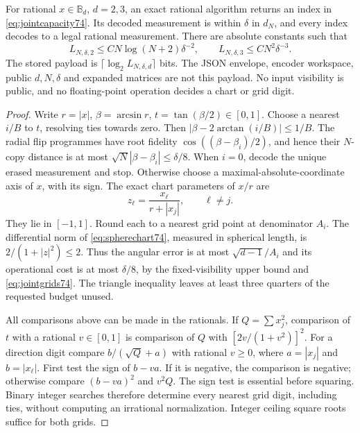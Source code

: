 \begin{theorem}\label{thm:jointcodec74}
For rational $x\in\mathbb B_d$, $d=2,3$, an exact rational algorithm
returns an index in \eqref{eq:jointcapacity74}. Its decoded measurement
is within $\delta$ in $d_N$, and every index decodes to a legal rational
measurement. There are absolute constants such that
\[
 L_{N,\delta,2}\le C N\log(N+2)\delta^{-2},\qquad
 L_{N,\delta,3}\le C N^2\delta^{-3}.
\]
The stored payload is $\lceil\log_2L_{N,\delta,d}\rceil$ bits. The
JSON envelope, encoder workspace, public $d,N,\delta$ and expanded
matrices are not this payload. No input visibility is public, and no
floating-point operation decides a chart or grid digit.
\end{theorem}
\begin{proof}
Write $r=|x|$, $\beta=\arcsin r$, $t=\tan(\beta/2)\in[0,1]$.
Choose a nearest $i/B$ to $t$, resolving ties towards zero. Then
$|\beta-2\arctan(i/B)|\le1/B$. The radial flip programmes have root
fidelity $\cos((\beta-\beta_i)/2)$, and hence their $N$-copy distance
is at most $\sqrt N|\beta-\beta_i|\le\delta/8$.
When $i=0$, decode the unique erased measurement and stop.
Otherwise choose a maximal-absolute-coordinate axis of $x$, with its
sign. The exact chart parameters of $x/r$ are
\[
 z_\ell=\frac{x_\ell}{r+|x_j|},\qquad \ell\ne j.
\]
They lie in $[-1,1]$. Round each to a nearest grid point at denominator
$A_i$. The differential norm of \eqref{eq:spherechart74}, measured
in spherical length, is $2/(1+|z|^2)\le2$. Thus the angular error is
at most $\sqrt{d-1}/A_i$ and its operational cost is at most $\delta/8$,
by the fixed-visibility upper bound and \eqref{eq:jointgrids74}.
The triangle inequality leaves at least three quarters of the
requested budget unused.

All comparisons above can be made in the rationals. If $Q=\sum x_j^2$,
comparison of $t$ with a rational $v\in[0,1]$ is comparison of $Q$
with $[2v/(1+v^2)]^2$. For a direction digit compare
$b/(\sqrt Q+a)$ with rational $v\ge0$, where $a=|x_j|$ and
$b=|x_\ell|$. First test the sign of $b-va$. If it is negative, the
comparison is negative; otherwise compare $(b-va)^2$ and $v^2Q$.
The sign test is essential before squaring. Binary integer searches
therefore determine every nearest grid digit, including ties, without
computing an irrational normalization. Integer ceiling square roots
suffice for both grids.


\end{proof}
